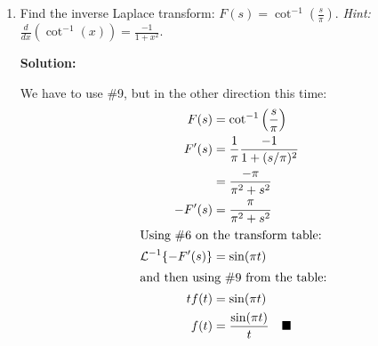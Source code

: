 \documentclass[letterpaper, fontsize=11pt]{scrartcl} %
\numberwithin{equation}{section} %
\numberwithin{figure}{section} %
\numberwithin{table}{section} %
\begin{document}
\begin{enumerate}
\begin{enumerate}
\item Find the inverse Laplace transform: $F(s) =\cot^{-1}\left(\frac{s}{\pi}\right)$. \textit{Hint:} $\frac{d}{dx}\left(\cot^{-1}(x)\right) = \frac{-1}{1 + x^2}$.
\par \textbf{Solution:}
\par We have to use \#9, but in the other direction this time:
\begin{align*}
F(s) &=\cot^{-1}\left(\frac{s}{\pi}\right)\\
F'(s) &=\frac{1}{\pi} \frac{-1}{1 + (s/\pi)^2}\\
&= \frac{-\pi}{\pi^2 + s^2}\\
-F'(s) &= \frac{\pi}{\pi^2 + s^2}\\
\intertext{Using \#6 on the transform table:}
\mathcal{L}^{-1}\{-F'(s)\} &= \sin(\pi t)\\
\intertext{and then using \#9 from the table:}
tf(t) &= \sin(\pi t)\\
f(t) &= \frac{\sin(\pi t)}{t} \quad\blacksquare
\end{align*}

\end{enumerate}


\end{enumerate}
\end{document}
